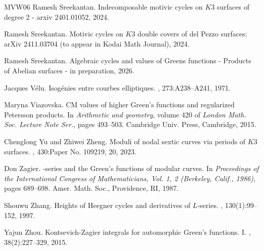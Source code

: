 \documentclass[11pt,a4paper]{article}
\begin{document}
\begin{thebibliography}{MVW06}
Ramesh Sreekantan.
\newblock Indecomposable motivic cycles on {$K3$} surfaces of degree 2 - arxiv
  2401.01052, 2024.

Ramesh Sreekantan.
\newblock Motivic cycles on {$K3$} double covers of del {P}ezzo surfaces:
  ar{X}iv 2411.03704 (to appear in {K}odai {M}ath {J}ournal), 2024.

Ramesh Sreekantan.
\newblock Algebraic cycles and values of {G}reens functions - {P}roducts of
  {A}belian surfaces - in preparation, 2026.

Jacques V\'elu.
\newblock Isog\'enies entre courbes elliptiques.
, 273:A238--A241, 1971.

Maryna Viazovska.
\newblock C{M} values of higher {G}reen's functions and regularized {P}etersson
  products.
\newblock In {\em Arithmetic and geometry}, volume 420 of {\em London Math.
  Soc. Lecture Note Ser.}, pages 493--503. Cambridge Univ. Press, Cambridge,
  2015.

Chenglong Yu and Zhiwei Zheng.
\newblock Moduli of nodal sextic curves via periods of {$K3$} surfaces.
, 430:Paper No. 109219, 20, 2023.

Don Zagier.
-series and the {G}reen's functions of modular curves.
\newblock In {\em Proceedings of the {I}nternational {C}ongress of
  {M}athematicians, {V}ol. 1, 2 ({B}erkeley, {C}alif., 1986)}, pages 689--698.
  Amer. Math. Soc., Providence, RI, 1987.

Shouwu Zhang.
\newblock Heights of {H}eegner cycles and derivatives of {$L$}-series.
, 130(1):99--152, 1997.

Yajun Zhou.
\newblock Kontsevich-{Z}agier integrals for automorphic {G}reen's functions.
  {I}.
, 38(2):227--329, 2015.

\end{thebibliography}
\end{document}
